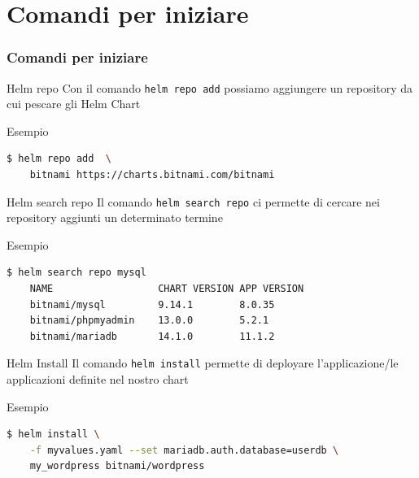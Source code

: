 \documentclass{beamer}
\begin{document}
 \section{Comandi per iniziare}
 \begin{frame}
 \frametitle{Comandi per iniziare}
 \begin{block}{Helm repo}
  Con il comando \lstinline[language=bash]{helm repo add} possiamo aggiungere un repository da cui pescare gli Helm Chart
  \end{block}
  \framebreak
  \begin{block}{Esempio}
  \begin{lstlisting}[backgroundcolor=\color{white},language=bash,basicstyle=\small]
  $ helm repo add  \
    bitnami https://charts.bitnami.com/bitnami
  \end{lstlisting}
  \end{block}
  \framebreak
  
  \begin{block}{Helm search repo}
  Il comando \lstinline[language=bash]{helm search repo} ci permette di cercare nei repository aggiunti un determinato termine
  \end{block}
  
  \framebreak
  \begin{block}{Esempio}
  \begin{lstlisting}[backgroundcolor=\color{white},language=bash,basicstyle=\small]
  $ helm search repo mysql
    NAME                  CHART VERSION APP VERSION                                       
    bitnami/mysql         9.14.1        8.0.35     
    bitnami/phpmyadmin    13.0.0        5.2.1      
    bitnami/mariadb       14.1.0        11.1.2     
  \end{lstlisting}
  \end{block}
  \framebreak
  
  \begin{block}{Helm Install}
  Il comando \lstinline[language=bash]{helm install} permette di deployare l'applicazione/le applicazioni definite nel nostro chart
  \end{block}
  
  \framebreak
  \begin{block}{Esempio}
  \begin{lstlisting}[backgroundcolor=\color{white},language=bash,basicstyle=\small]
  $ helm install \
    -f myvalues.yaml --set mariadb.auth.database=userdb \ 
    my_wordpress bitnami/wordpress
  \end{lstlisting}
  \end{block}
 \end{frame}
\end{document}
